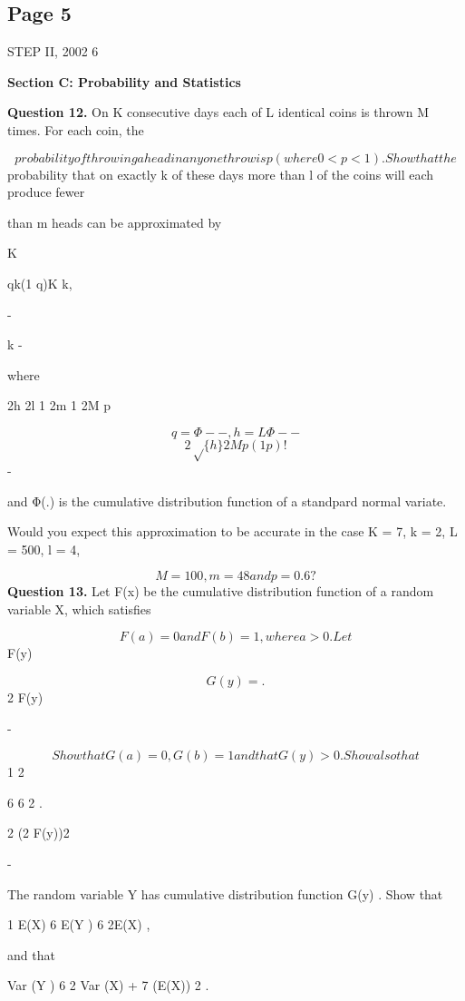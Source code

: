 \documentclass[12pt]{article}
\begin{document}
\subsection*{Page 5}
\begin{flushleft}
STEP II, 2002 6\par
\bigskip\textbf{Section C: Probability and Statistics}\par
\bigskip\textbf{Question 12.} On K consecutive days each of L identical coins is thrown M times. For each coin, the\par
\[probability of throwing a head in any one throw is p (where 0 < p < 1). Show that the\]
probability that on exactly k of these days more than l of the coins will each produce fewer\par
than m heads can be approximated by\par
K\par
qk(1 q)K k,\par
-\par
k -\par
\lambda \mu\par
where\par
2h 2l 1 2m 1 2M p\par
\[q = Φ - - , h = LΦ - -\]
\[2\sqrt\{h\} 2 M p(1 p) !\]
\lambda \mu -\par
and Φ(.) is the cumulative distribution function of a standpard normal variate.\par
Would you expect this approximation to be accurate in the case K = 7, k = 2, L = 500, l = 4,\par
\[M = 100, m = 48 and p = 0.6 ?\]
\bigskip\textbf{Question 13.} Let F(x) be the cumulative distribution function of a random variable X, which satisfies\par
\[F(a) = 0 and F(b) = 1, where a > 0. Let\]
F(y)\par
\[G(y) = .\]
2 F(y)\par
-\par
\[Show that G(a) = 0 , G(b) = 1 and that G (y) > 0 . Show also that\]
1 2\par
6 6 2 .\par
2 (2 F(y))2\par
-\par
The random variable Y has cumulative distribution function G(y) . Show that\par
1 E(X) 6 E(Y ) 6 2E(X) ,\par
and that\par
Var (Y ) 6 2 Var (X) + 7 (E(X)) 2 .\par
\end{flushleft}
\end{document}
